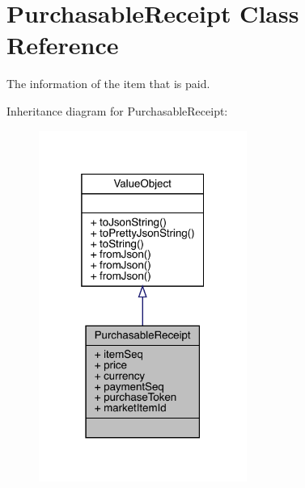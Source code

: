 \hypertarget{classcom_1_1toast_1_1android_1_1gamebase_1_1base_1_1purchase_1_1_purchasable_receipt}{}\section{Purchasable\+Receipt Class Reference}
\label{classcom_1_1toast_1_1android_1_1gamebase_1_1base_1_1purchase_1_1_purchasable_receipt}


The information of the item that is paid.  




Inheritance diagram for Purchasable\+Receipt\+:
\nopagebreak
\begin{figure}[H]
\begin{center}
\leavevmode
\includegraphics[width=193pt]{classcom_1_1toast_1_1android_1_1gamebase_1_1base_1_1purchase_1_1_purchasable_receipt__inherit__graph}
\end{center}
\end{figure}


